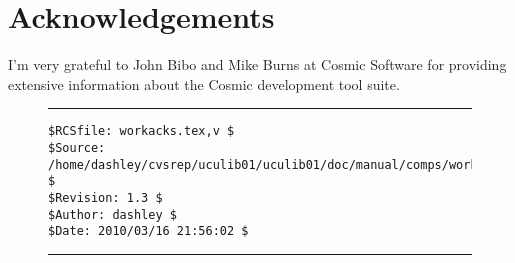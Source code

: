 \chapter{Acknowledgements}

I'm very grateful to 
John Bibo \cite{bibref:i:johnbibo}
and
Mike Burns \cite{bibref:i:mikeburns}
at
Cosmic Software \cite{bibref:c:cosmicsoftware}
for providing extensive information about the
Cosmic development tool suite.


\begin{figure}[b]
\noindent\rule[-0.25in]{\textwidth}{1pt}
\begin{tiny}
\begin{verbatim}
$RCSfile: workacks.tex,v $
$Source: /home/dashley/cvsrep/uculib01/uculib01/doc/manual/comps/workacks.tex,v $
$Revision: 1.3 $
$Author: dashley $
$Date: 2010/03/16 21:56:02 $
\end{verbatim}
\end{tiny}
\noindent\rule[0.25in]{\textwidth}{1pt}
\end{figure}

%
%
%

